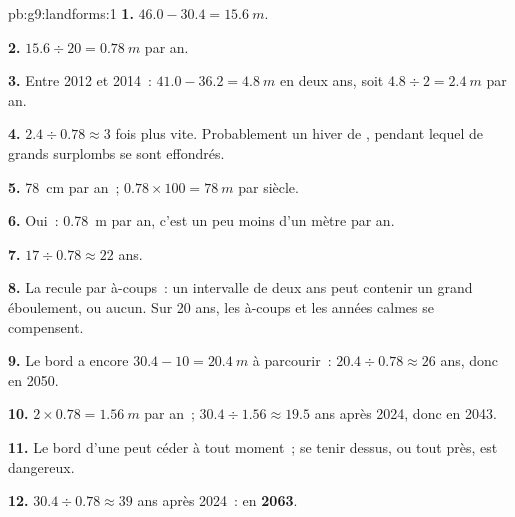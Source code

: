 \begin{solution}{pb:g9:landforms:1}
\textbf{1.} $46.0 - 30.4 = \qty{15.6}{m}$.

\textbf{2.} $15.6 \div 20 = \qty{0.78}{m}$ par an.

\textbf{3.} Entre 2012 et 2014~: $41.0 - 36.2 = \qty{4.8}{m}$ en deux
ans, soit $4.8 \div 2 = \qty{2.4}{m}$ par an.

\textbf{4.} $2.4 \div 0.78 \approx 3$ fois plus vite. Probablement un
hiver de , pendant lequel de grands surplombs se sont effondrés.

\textbf{5.} \qty{78}{cm} par an~; $0.78 \times 100 = \qty{78}{m}$ par
siècle.

\textbf{6.} Oui~: \qty{0.78}{m} par an, c'est un peu moins d'un mètre par an.

\textbf{7.} $17 \div 0.78 \approx 22$ ans.

\textbf{8.} La  recule par à-coups~: un intervalle de deux ans peut
contenir un grand éboulement, ou aucun. Sur 20 ans, les à-coups et les
années calmes se compensent.

\textbf{9.} Le bord a encore $30.4 - 10 = \qty{20.4}{m}$ à parcourir~: $20.4 \div 0.78
\approx 26$ ans, donc en 2050.

\textbf{10.} $2 \times 0.78 = \qty{1.56}{m}$ par an~; $30.4 \div 1.56
\approx 19.5$ ans après 2024, donc en 2043.

\textbf{11.} Le bord d'une  peut céder à tout moment~; se tenir
dessus, ou tout près, est dangereux.

\textbf{12.} $30.4 \div 0.78 \approx 39$ ans après 2024~: en
\textbf{2063}.
\end{solution}
